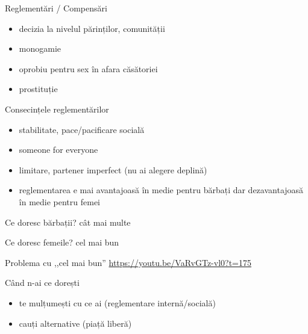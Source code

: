 \documentclass{simple}
\begin{document}
\begin{frame}{Reglementări / Compensări}
  \begin{itemize}
    \pause
    \item decizia la nivelul părinților, comunității
    \pause
    \item monogamie
    \pause
    \item oprobiu pentru sex în afara căsătoriei
    \pause
    \item prostituție
  \end{itemize}
\end{frame}

\begin{frame}{Consecințele reglementărilor}
  \begin{itemize}
    \pause
    \item stabilitate, pace/pacificare socială
    \pause
    \item someone for everyone
    \pause
    \item limitare, partener imperfect (nu ai alegere deplină)
    \pause
    \item reglementarea e mai avantajoasă în medie pentru bărbați dar dezavantajoasă în medie pentru femei
  \end{itemize}
\end{frame}

\begin{frame}{Ce doresc bărbații?}
  \centering
  \pause
  \vspace{1cm}
  \Large{cât mai multe}
\end{frame}

\begin{frame}{Ce doresc femeile?}
  \centering
  \pause
  \vspace{1cm}
  \Large{cel mai bun}
\end{frame}

\begin{frame}{Problema cu ,,cel mai bun''}
  \url{https://youtu.be/VaRvGTz-vl0?t=175}
\end{frame}

\begin{frame}{Când n-ai ce dorești}
  \begin{itemize}
    \pause
    \item te mulțumești cu ce ai (reglementare internă/socială)
    \pause
    \item cauți alternative (piață liberă)
  \end{itemize}
\end{frame}
\end{document}
